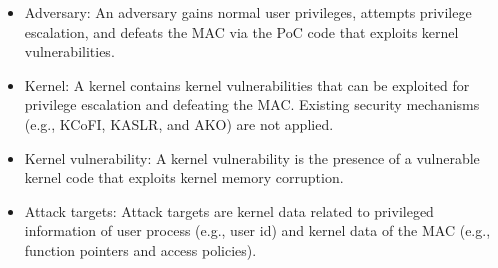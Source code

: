 \begin{itemize}[topsep=0pt]%
  \item Adversary: An adversary gains normal user privileges, attempts
  privilege escalation, and defeats the MAC via the PoC code that exploits kernel
  vulnerabilities.

\item Kernel: A kernel contains kernel vulnerabilities that can be exploited for
privilege escalation and defeating the MAC. Existing security
mechanisms (e.g., KCoFI, KASLR, and AKO) are not applied.


  \item Kernel vulnerability: A kernel vulnerability is the presence of a vulnerable
  kernel code that exploits kernel memory corruption.

  \item Attack targets: Attack targets are kernel data related to
  privileged information of user process (e.g., user id) and kernel data of the MAC (e.g., function
  pointers and access policies).

\end{itemize}


